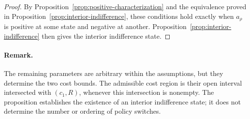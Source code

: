 \documentclass[11pt]{article}
\begin{document}
\begin{proof}
By Proposition~\ref{prop:positive-characterization} and the equivalence
proved in Proposition~\ref{prop:interior-indifference}, these conditions
hold exactly when $a_\rho$ is positive at some state and negative at
another. Proposition~\ref{prop:interior-indifference} then gives the
interior indifference state.
\end{proof}

\paragraph{Remark.}
The remaining parameters are arbitrary within the assumptions, but they
determine the two cost bounds. The admissible cost region is their open
interval intersected with $(c_1,R)$, whenever this intersection is
nonempty. The proposition establishes the existence of an interior
indifference state; it does not determine the number or ordering of
policy switches.
\end{document}
